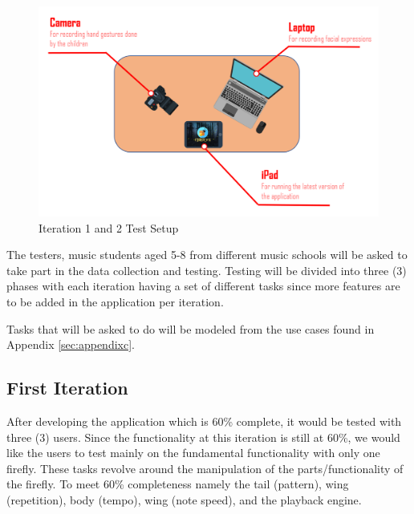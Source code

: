 \begin{figure}[H]
    \centering
    \includegraphics[width=15cm]{figures/Test_Setup.png}
    \caption{Iteration 1 and 2 Test Setup}
    \label{test1and2}
\end{figure}

The testers, music students aged 5-8 from different music schools will be asked to take part in the data collection and testing. Testing will be divided into three (3) phases with each iteration having a set of different tasks since more features are to be added in the application per iteration. 

Tasks that will be asked to do will be modeled from the use cases found in Appendix \ref{sec:appendixc}.

\subsection{First Iteration}
After developing the application which is 60\% complete, it would be tested with three (3) users. Since the functionality at this iteration is still at 60\%, we would like the users to test mainly on the fundamental functionality with only one firefly. These tasks revolve around the manipulation of the parts/functionality of the firefly. To meet 60\% completeness namely the tail (pattern), wing (repetition), body (tempo), wing (note speed), and the playback engine. 

